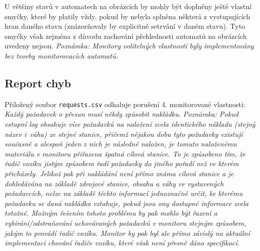 \documentclass[a4paper]{article}
\begin{document}
U většiny stavů v automatech na obrázcích by mohly být doplněny ještě vlastní smyčky, které by platily vždy, pokud by nebyla splněna některá z vystupujících hran daného stavu (znázorňovaly by explicitně setrvání v daném stavu). Tyto smyčky však zejména z důvodu zachování přehlednosti automatů na obrázcích uvedeny nejsou.\newline
\textit{Poznámka: Monitory volitelných vlastností byly implementovány bez tvorby monitorovacích automatů.}




\subsection*{Report chyb}

Přiložený soubor \verb|requests.csv| odhaluje porušení 4. monitorované vlastnosti: \textit{Každý požadavek o přesun musí někdy způsobit nakládku.}\newline
\textit{Poznámka: Pokud vstupní log obsahuje více požadavků na naložení zcela identického nákladu (stejný název i~váha) ze stejné stanice, přičemž nějakou dobu tyto požadavky existují současně a alespoň jeden z nich je následně naložen, je tomuto naloženému materiálu v monitoru přiřazena špatná cílová stanice. To je způsobeno tím, že řadič vozíku jistým způsobem řadí požadavky do jiného pořadí než ve kterém přicházely. Jelikož pak při nakládání není přímo známa cílová stanice a je dohledávána na základě zdrojové stanice, obsahu a váhy ve vystavených požadavcích, nelze na základě těchto informací jednoznačně určit, ke kterému požadavku se daná nakládka vztahuje, pokud jsou ony dostupné informace zcela totožné. Možným řešením tohoto problému by pak mohlo být řazení a vybírání/odstraňování uchovávaných požadavků v monitoru stejným způsobem, jakým to provádí řadič vozíku. Monitor by pak byl ale přímo závislý na aktuální implementaci chování řadiče vozíku, které však není přesně dáno specifikací.}
\end{document}
